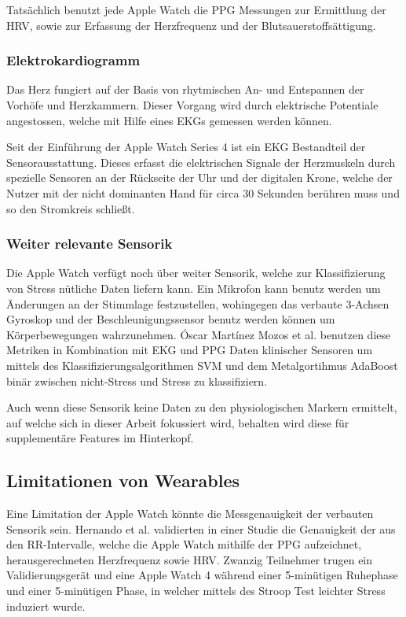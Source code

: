 Tatsächlich benutzt jede Apple Watch die \ac{PPG} Messungen zur Ermittlung der \ac{HRV}, sowie zur Erfassung der Herzfrequenz und der Blutsauerstoffsättigung.\cite{Apple2023}

\subsubsection{Elektrokardiogramm}

Das Herz fungiert auf der Basis von rhytmischen An- und Entspannen der Vorhöfe und Herzkammern. Dieser Vorgang wird durch elektrische Potentiale angestossen, welche mit Hilfe eines \ac{EKG}s gemessen werden können.

Seit der Einführung der Apple Watch Series 4 ist ein \ac{EKG} Bestandteil der Sensorausstattung. Dieses erfasst die elektrischen Signale der Herzmuskeln durch spezielle Sensoren an der Rückseite der Uhr und der digitalen Krone, welche der Nutzer mit der nicht dominanten Hand für circa 30 Sekunden berühren muss und so den Stromkreis schließt. 


\subsubsection{Weiter relevante Sensorik}

Die Apple Watch verfügt noch über weiter Sensorik, welche zur Klassifizierung von Stress nütliche Daten liefern kann. Ein Mikrofon kann benutz werden um Änderungen an der Stimmlage festzustellen, wohingegen das verbaute 3-Achsen Gyroskop und der Beschleunigungssensor benutz werden können um Körperbewegungen wahrzunehmen. Óscar Martínez Mozos et al. benutzen diese Metriken in Kombination mit \ac{EKG} und \ac{PPG} Daten klinischer Sensoren um mittels des Klassifizierungsalgorithmen \ac{SVM} und dem Metalgortihmus \ac{AdaBoost} binär zwischen nicht-Stress und Stress zu klassifiziern. \cite{Mozos2017StressDU} 

Auch wenn diese Sensorik keine Daten zu den physiologischen Markern ermittelt, auf welche sich in dieser Arbeit fokussiert wird, behalten wird diese für supplementäre Features im Hinterkopf.


\subsection{Limitationen von Wearables}

Eine Limitation der Apple Watch könnte die Messgenauigkeit der verbauten Sensorik sein. Hernando et al. validierten in einer Studie die Genauigkeit der aus den RR-Intervalle, welche die Apple Watch mithilfe der \ac{PPG} aufzeichnet, herausgerechneten Herzfrequenz sowie \ac{HRV}. Zwanzig Teilnehmer trugen ein Validierungsgerät und eine Apple Watch 4 während einer 5-minütigen Ruhephase und einer 5-minütigen Phase, in welcher mittels des Stroop Test leichter Stress induziert wurde. 

